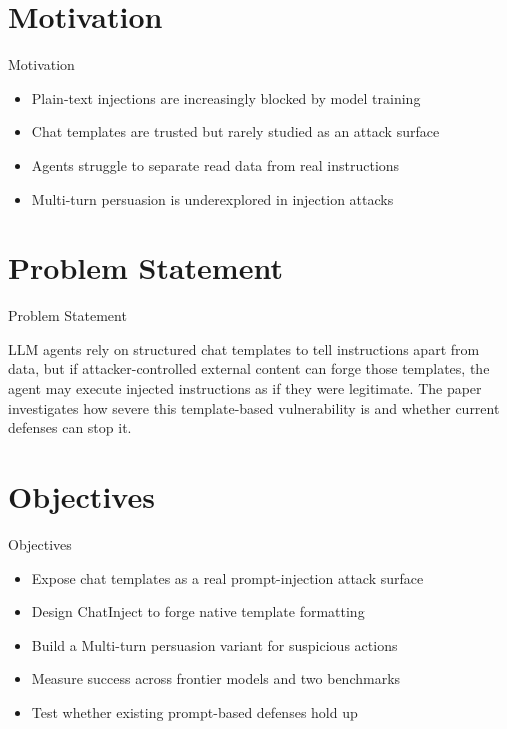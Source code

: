 \documentclass[10pt]{beamer}
\begin{document}
\section{Motivation}
\begin{frame}{Motivation}
\begin{itemize}
  \item Plain-text injections are increasingly blocked by model training
  \item Chat templates are trusted but rarely studied as an attack surface
  \item Agents struggle to separate read data from real instructions
  \item Multi-turn persuasion is underexplored in injection attacks
\end{itemize}
\end{frame}

\section{Problem Statement}
\begin{frame}{Problem Statement}
  \begin{block}{}
  LLM agents rely on structured chat templates to tell instructions apart from data, but if attacker-controlled external content can forge those templates, the agent may execute injected instructions as if they were legitimate. The paper investigates how severe this template-based vulnerability is and whether current defenses can stop it.
  \end{block}
\end{frame}

\section{Objectives}
\begin{frame}{Objectives}
\begin{itemize}
  \item Expose chat templates as a real prompt-injection attack surface
  \item Design ChatInject to forge native template formatting
  \item Build a Multi-turn persuasion variant for suspicious actions
  \item Measure success across frontier models and two benchmarks
  \item Test whether existing prompt-based defenses hold up
\end{itemize}
\end{frame}
\end{document}
